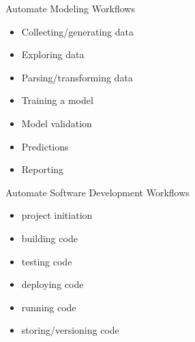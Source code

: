 \documentclass{beamer}
\begin{document}
\begin{frame}{Automate Modeling Workflows}

\begin{itemize}
\item Collecting/generating data
\item Exploring data
\item Parsing/transforming data
\item Training a model
\item Model validation
\item Predictions
\item Reporting
\end{itemize}
\end{frame}



\begin{frame}{Automate Software Development Workflows}

\begin{itemize}
\item project initiation
\item building code
\item testing code
\item deploying code
\item running code
\item storing/versioning code
\end{itemize}
\end{frame}


%
%
%
\end{document}
